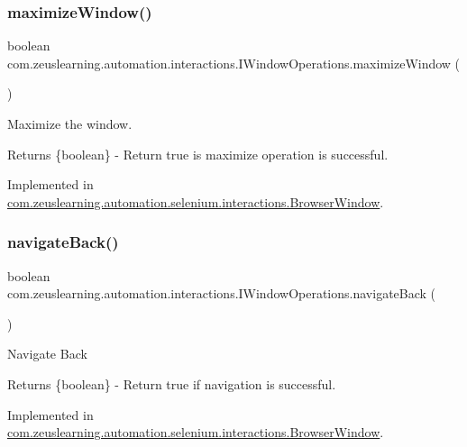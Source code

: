 \subsubsection{\texorpdfstring{maximize\+Window()}{maximizeWindow()}}
{\footnotesize\ttfamily boolean com.\+zeuslearning.\+automation.\+interactions.\+I\+Window\+Operations.\+maximize\+Window (\begin{DoxyParamCaption}{ }\end{DoxyParamCaption})}

Maximize the window.

\begin{DoxyReturn}{Returns}
\{boolean\} -\/ Return {\ttfamily true} is maximize operation is successful. 
\end{DoxyReturn}


Implemented in \hyperlink{classcom_1_1zeuslearning_1_1automation_1_1selenium_1_1interactions_1_1BrowserWindow_a446ec66dd4fb469961b7242a9b0c1a35}{com.\+zeuslearning.\+automation.\+selenium.\+interactions.\+Browser\+Window}.

\hypertarget{interfacecom_1_1zeuslearning_1_1automation_1_1interactions_1_1IWindowOperations_a609624cbf549bfa10a2fd9265f33ea61}{}\label{interfacecom_1_1zeuslearning_1_1automation_1_1interactions_1_1IWindowOperations_a609624cbf549bfa10a2fd9265f33ea61} 
\subsubsection{\texorpdfstring{navigate\+Back()}{navigateBack()}}
{\footnotesize\ttfamily boolean com.\+zeuslearning.\+automation.\+interactions.\+I\+Window\+Operations.\+navigate\+Back (\begin{DoxyParamCaption}{ }\end{DoxyParamCaption})}

Navigate Back

\begin{DoxyReturn}{Returns}
\{boolean\} -\/ Return {\ttfamily true} if navigation is successful. 
\end{DoxyReturn}


Implemented in \hyperlink{classcom_1_1zeuslearning_1_1automation_1_1selenium_1_1interactions_1_1BrowserWindow_ac680899d66b9d544bed94dc3de808559}{com.\+zeuslearning.\+automation.\+selenium.\+interactions.\+Browser\+Window}.

